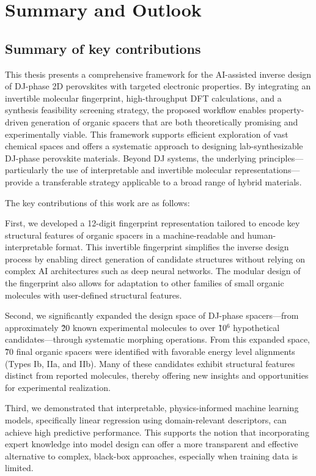 \chapter{Summary and Outlook}\label{c:conclusion}

\section{Summary of key contributions}

This thesis presents a comprehensive framework for the AI-assisted inverse design of DJ-phase 2D perovskites with targeted electronic properties. By integrating an invertible molecular fingerprint, high-throughput DFT calculations, and a synthesis feasibility screening strategy, the proposed workflow enables property-driven generation of organic spacers that are both theoretically promising and experimentally viable. This framework supports efficient exploration of vast chemical spaces and offers a systematic approach to designing lab-synthesizable DJ-phase perovskite materials. Beyond DJ systems, the underlying principles—particularly the use of interpretable and invertible molecular representations—provide a transferable strategy applicable to a broad range of hybrid materials.

The key contributions of this work are as follows:

First, we developed a 12-digit fingerprint representation tailored to encode key structural features of organic spacers in a machine-readable and human-interpretable format. This invertible fingerprint simplifies the inverse design process by enabling direct generation of candidate structures without relying on complex AI architectures such as deep neural networks. The modular design of the fingerprint also allows for adaptation to other families of small organic molecules with user-defined structural features.

Second, we significantly expanded the design space of DJ-phase spacers—from approximately \~20 known experimental molecules to over \~10$^6$ hypothetical candidates—through systematic morphing operations. From this expanded space, \~70 final organic spacers were identified with favorable energy level alignments (Types Ib, IIa, and IIb). Many of these candidates exhibit structural features distinct from reported molecules, thereby offering new insights and opportunities for experimental realization.

Third, we demonstrated that interpretable, physics-informed machine learning models, specifically linear regression using domain-relevant descriptors, can achieve high predictive performance. This supports the notion that incorporating expert knowledge into model design can offer a more transparent and effective alternative to complex, black-box approaches, especially when training data is limited.

